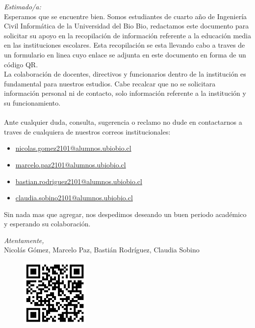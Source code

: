 \documentclass{templateNote}
\newcommand{\email}[1]{\href{mailto:#1}{#1}}
\begin{document}


\portada
\margenes 

\noindent\textit{Estimado/a:}\\

Esperamos que se encuentre bien. Somos estudiantes de cuarto año de Ingeniería Civil Informática de la Universidad del Bio Bio, redactamos este documento para solicitar su apoyo en la recopilación de información referente a la educación media en las instituciones escolares. Esta recopilación se esta llevando cabo a traves de un formulario en linea cuyo enlace se adjunta en este documento en forma de un código QR. \\La colaboración de docentes, directivos y funcionarios dentro de la institución es fundamental para nuestros estudios. Cabe recalcar que no se solicitara información personal ni de contacto, solo información referente a la institución y su funcionamiento.  
\\\\
Ante cualquier duda, consulta, sugerencia o reclamo no dude en contactarnos a traves de cualquiera de nuestros correos institucionales:
\begin{itemize}
    \item \email{nicolas.gomez2101@alumnos.ubiobio.cl}
    \item \email{marcelo.paz2101@alumnos.ubiobio.cl}
    \item \email{bastian.rodriguez2101@alumnos.ubiobio.cl}
    \item \email{claudia.sobino2101@alumnos.ubiobio.cl}
\end{itemize}

\noindent Sin nada mas que agregar, nos despedimos deseando un buen periodo académico y esperando su colaboración.

\vspace*{0.8cm}
\begin{center}
    \textit{Atentamente,}\\
        Nicolás Gómez, Marcelo Paz, Bastián Rodríguez, Claudia Sobino
\end{center}

\vspace*{1cm}
\begin{figure}[H]
    \centering
    \includegraphics[width=0.3\textwidth]{img/qr.jpg}
\end{figure}
\end{document}

